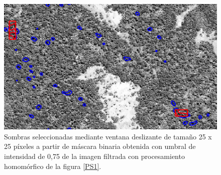 \begin{figure}[h!]
    \includegraphics[width=\textwidth]{Imagenes/Homomorfico/PS1_superpuestas.png}
     \hfill
     \caption{Sombras seleccionadas mediante ventana deslizante de tamaño 25 x 25 píxeles a partir de máscara binaria obtenida con umbral de intensidad de 0,75 de la imagen filtrada con procesamiento homomórfico de la figura \ref{PS1}.}
    \label{PS1 superpuesto}
\end{figure}